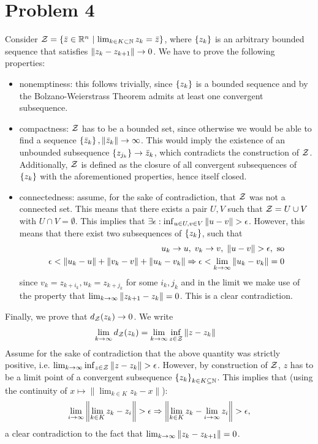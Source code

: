 \documentclass[10pt]{article}
\begin{document}
\section*{Problem 4}
Consider $\mathcal{Z} = \left\{ \bar{z} \in \mathbb{R}^n \ \middle| \  \lim_{k \in K \subset \mathbb{N}} z_{k}
= \bar{z} \right\}$, where $\left\{ z_k \right\}$ is an arbitrary bounded sequence that satisfies
$\left \| z_k - z_{k+1} \right \| \to 0$. We have to prove the following properties:
\begin{itemize}
\item nonemptiness: this follows trivially, since $\left\{ z_k \right\}$ is a bounded
sequence and by the Bolzano-Weierstrass Theorem admits at least one convergent
subsequence.
\item compactness: $\mathcal{Z}$ has to be a bounded set, since otherwise we would be
able to find a sequence $\left\{ \bar{z}_k \right\}, \left \| \bar{z}_k \right \| \to \infty$. This
would imply the existence of an unbounded subsequence $\left\{ z_{j_k} \right\} \to
\bar{z}_k$, which contradicts the construction of $\mathcal{Z}$.
Additionally, $\mathcal{Z}$ is defined as the closure of all convergent subsequences of
$\left\{ z_k \right\}$ with the aforementioned properties, hence itself closed.
\item connectedness: assume, for the sake of contradiction, that $\mathcal{Z}$ was not
a connected set. This means that there exists a pair $U, V$ such
that $\mathcal{Z} = U \cup V$ with $U \cap V = \emptyset$. This implies that
$\exists \epsilon: \inf_{u \in U, v \in V} \left \| u - v \right \| > \epsilon$. However,
this means that there exist two subsequences of $\left\{ z_k \right\}$, such that
\begin{align*}
    u_{k} \to u, \; v_{k} \to v, \; \left \| u - v \right \| > \epsilon, \text{ so} \\
    \epsilon < \left \| u_k - u \right \| + \left \| v_k - v \right \| + \left \| u_k - v_k \right \| \Rightarrow
    \epsilon < \lim_{k \to \infty} \left \| u_k - v_k \right \| = 0
\end{align*}
since $v_k = z_{k + i_k}, u_k = z_{k + j_k}$ for some $i_k, j_k$ and in the
limit we make use of the property that $\lim_{k \to \infty} \left \| z_{k+1} -
z_k \right \| = 0$. This is a clear contradiction.

\end{itemize}
Finally, we prove that $d_{\mathcal{Z}}(z_k) \to 0$. We write
\begin{align*}
    \lim_{k \to \infty} d_{\mathcal{Z}}(z_k) &=
        \lim_{k \to \infty} \inf_{z \in \mathcal{Z}} \left \| z - z_k \right \|
\end{align*}
Assume for the sake of contradiction that the above quantity was strictly
positive, i.e. $\lim_{k \to \infty} \inf_{z \in \mathcal{Z}} \left \| z - z_k \right \| > \epsilon$.
However, by construction of $\mathcal{Z}$, $z$ has to be a limit point of a convergent
subsequence $\left\{ z_k \right\}_{k \in K \subseteq \mathbb{N}}$. This implies that (using the
continuity of $x \mapsto \| \lim_{k \in K} z_k - x \|$):
\[
    \lim_{i \to \infty} \left \| \lim_{k \in K} z_k - z_i \right \| > \epsilon \Rightarrow
    \left \| \lim_{k \in K} z_k - \lim_{i \to \infty} z_i \right \| > \epsilon,
\]
a clear contradiction to the fact that $\lim_{k \to \infty} \left \| z_k - z_{k+1} \right \|
= 0$.
\end{document}
